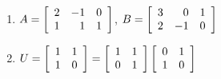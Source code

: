 \begin{multicols}{2}
\begin{ex}
\begin{enumerate}[label={\alph*.}]
\item $A = \left[ \begin{array}{rrr}
2 & -1 & 0 \\
1 & 1 & 1
\end{array} \right]$, 
$B = \left[ \begin{array}{rrr}
3 & 0 & 1 \\
2 & -1 & 0
\end{array} \right]$

\end{enumerate}
\begin{sol}
\begin{enumerate}[label={\alph*.}]
\setcounter{enumi}{1}
\item $U = \left[ \begin{array}{rr}
1 & 1 \\
1 & 0
\end{array} \right] = \left[ \begin{array}{rr}
1 & 1 \\
0 & 1
\end{array} \right] \left[ \begin{array}{rr}
0 & 1 \\
1 & 0
\end{array} \right]$

\end{enumerate}
\end{sol}
\end{ex}


\end{multicols}
